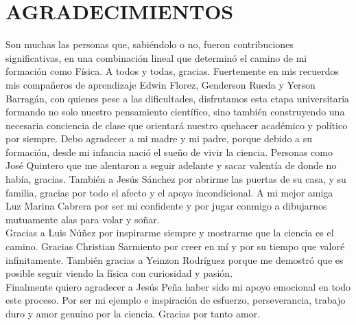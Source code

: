\newpage
\chapter*{AGRADECIMIENTOS}
\label{sec:resum}

Son muchas las personas que, sabiéndolo o no, fueron contribuciones significativas, en una combinación lineal que determinó el camino de mi formación como Física. A todos y todas, gracias. Fuertemente en mis recuerdos mis compañeros de aprendizaje Edwin Florez, Genderson Rueda y Yerson Barragán, con quienes pese a las dificultades, disfrutamos esta etapa universitaria formando no solo nuestro pensamiento científico, sino también construyendo una necesaria conciencia de clase que orientará nuestro quehacer académico y político por siempre. Debo agradecer a mi madre y mi padre, porque debido a su formación, desde mi infancia nació el sueño de vivir la ciencia. Personas como José Quintero que me alentaron a seguir adelante y sacar valentía de donde no había, gracias. También a Jesús Sánchez por abrirme las puertas de su casa, y su familia, gracias por todo el afecto y el apoyo incondicional. A mi mejor amiga Luz Marina Cabrera por ser mi confidente y por jugar conmigo a dibujarnos mutuamente alas para volar y soñar.\\ 

Gracias a Luis Núñez por inspirarme siempre y mostrarme que la ciencia es el camino. Gracias Christian Sarmiento por creer en mí y por su tiempo que valoré infinitamente. También gracias a Yeinzon Rodríguez porque me demostró que es posible seguir viendo la física con curiosidad y pasión.\\

Finalmente quiero agradecer a Jesús Peña haber sido mi apoyo emocional en todo este proceso. Por ser mi ejemplo e inspiración de esfuerzo, perseverancia, trabajo duro y amor genuino por la ciencia. Gracias por tanto amor.\\